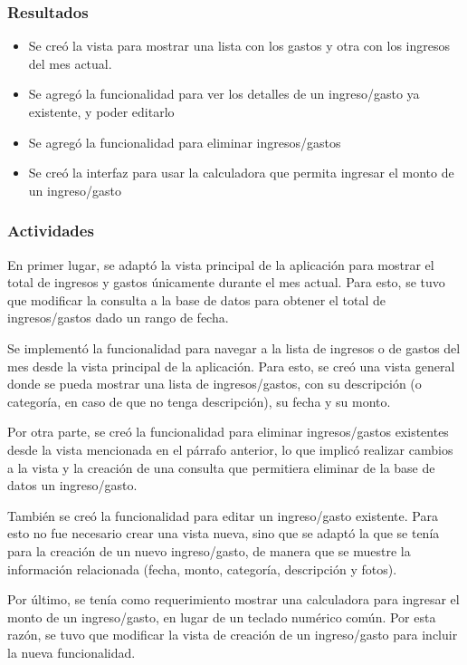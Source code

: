 \subsubsection{Resultados}
\begin{itemize}
\item Se creó la vista para mostrar una lista con los gastos y otra con los ingresos del mes actual.
\item Se agregó la funcionalidad para ver los detalles de un ingreso/gasto ya existente, y poder editarlo
\item Se agregó la funcionalidad para eliminar ingresos/gastos
\item Se creó la interfaz para usar la calculadora que permita ingresar el monto de un ingreso/gasto
\end{itemize}

\subsubsection{Actividades}
En primer lugar, se adaptó la vista principal de la aplicación para mostrar el total de ingresos y gastos únicamente durante el mes actual. Para esto, se tuvo que modificar la consulta a la base de datos para obtener el total de ingresos/gastos dado un rango de fecha.

Se implementó la funcionalidad para navegar a la lista de ingresos o de gastos del mes desde la vista principal de la aplicación. Para esto, se creó una vista general donde se pueda mostrar una lista de ingresos/gastos, con su descripción (o categoría, en caso de que no tenga descripción), su fecha y su monto.

Por otra parte, se creó la funcionalidad para eliminar ingresos/gastos existentes desde la vista mencionada en el párrafo anterior, lo que implicó realizar cambios a la vista y la creación de una consulta que permitiera eliminar de la base de datos un ingreso/gasto.

También se creó la funcionalidad para editar un ingreso/gasto existente. Para esto no fue necesario crear una vista nueva, sino que se adaptó la que se tenía para la creación de un nuevo ingreso/gasto, de manera que se muestre la información relacionada (fecha, monto, categoría, descripción y fotos).

Por último, se tenía como requerimiento mostrar una calculadora para ingresar el monto de un ingreso/gasto, en lugar de un teclado numérico común. Por esta razón, se tuvo que modificar la vista de creación de un ingreso/gasto para incluir la nueva funcionalidad. 

